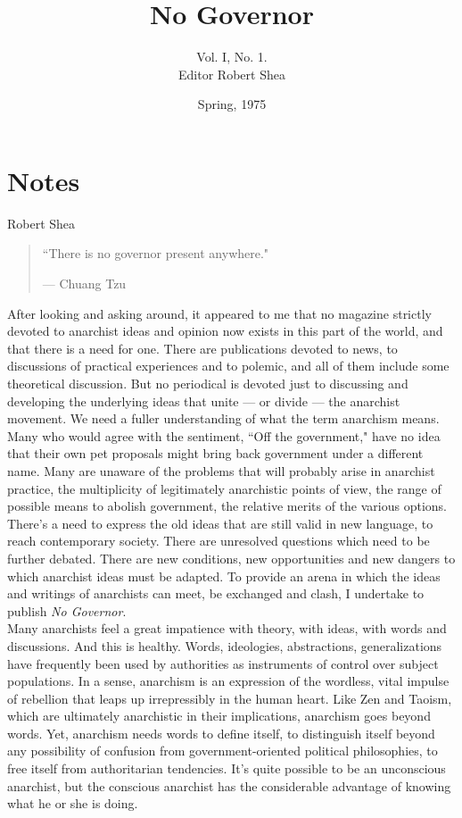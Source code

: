 \documentclass[12pt, onecolumn, letterpaper, oneside]{book}
\title{No Governor}
\author{Vol. I, No. 1.\\Editor Robert Shea}
\date{Spring, 1975}
\makeatletter
\newcommand\chapterauthor[1]{\authortoc{#1}\printchapterauthor{#1}}
\newcommand{\printchapterauthor}[1]{%
  {\parindent0pt\vspace*{-25pt}%
  \linespread{1.1}\large\scshape#1%
  \par\nobreak\vspace*{35pt}}
  \@afterheading%
}
\newcommand{\authortoc}[1]{%
  \addtocontents{toc}{\vskip-10pt}%
  \addtocontents{toc}{%
    \protect\contentsline{chapter}%
    {\hskip1.3em\mdseries\scshape\protect\scriptsize#1}{}{}}
  \addtocontents{toc}{\vskip5pt}%
}
\makeatother
\begin{document}
\sloppy

\maketitle

\tableofcontents

\chapter*{Notes}
\chapterauthor*{Robert Shea}

\blockquote{``There is no governor present anywhere."
\par\begin{flushright} --- Chuang Tzu \end{flushright}
}

After looking and asking around, it appeared to me that no magazine strictly devoted to anarchist ideas and opinion now exists in this part of the world, and that there is a need for one. There are publications devoted to news, to discussions of practical experiences and to polemic, and all of them include some theoretical discussion. But no periodical is devoted just to discussing and developing the underlying ideas that unite --- or divide --- the anarchist movement. We need a fuller understanding of what the term anarchism means. Many who would agree with the sentiment, ``Off the government," have no idea that their own pet proposals might bring back government under a different name. Many are unaware of the problems that will probably arise in anarchist practice, the multiplicity of legitimately anarchistic points of view, the range of possible means to abolish government, the relative merits of the various options.\\
There's a need to express the old ideas that are still valid in new language, to reach contemporary society. There are unresolved questions which need to be further debated. There are new conditions, new opportunities and new dangers to which anarchist ideas must be adapted. To provide an arena in which the ideas and writings of anarchists can meet, be exchanged and clash, I undertake to publish \emph{No Governor}.\\
Many anarchists feel a great impatience with theory, with ideas, with words and discussions. And this is healthy. Words, ideologies, abstractions, generalizations have frequently been used by authorities as instruments of control over subject populations. In a sense, anarchism is an expression of the wordless, vital impulse of rebellion that leaps up irrepressibly in the human heart. Like Zen and Taoism, which are ultimately anarchistic in their implications, anarchism goes beyond words. Yet, anarchism needs words to define itself, to distinguish itself beyond any possibility of confusion from government-oriented political philosophies, to free itself from authoritarian tendencies. It's quite possible to be an unconscious anarchist, but the conscious anarchist has the considerable advantage of knowing what he or she is doing.\\
\end{document}

